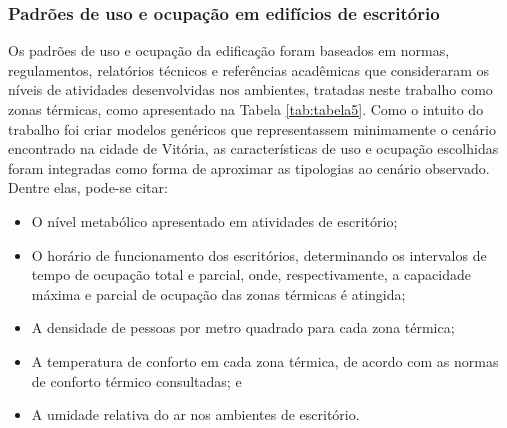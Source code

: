 \subsubsection{Padrões de uso e ocupação em edifícios de escritório}
Os padrões de uso e ocupação da edificação foram baseados em normas, regulamentos, relatórios 
técnicos e referências acadêmicas que consideraram os níveis de atividades desenvolvidas nos 
ambientes, tratadas neste trabalho como zonas térmicas, como apresentado na Tabela \ref{tab:tabela5}.\vspace*{0.3cm} \newline
Como o intuito do trabalho foi criar modelos genéricos que representassem minimamente o 
cenário encontrado na cidade de Vitória, as características de uso e ocupação escolhidas 
foram integradas como forma de aproximar as tipologias ao cenário observado. Dentre elas, 
pode-se citar:
\begin{itemize}
    \item O nível metabólico apresentado em atividades de escritório;
    \item O horário de funcionamento dos escritórios, determinando os intervalos de tempo de ocupação total e parcial, onde, respectivamente, a capacidade máxima e parcial de ocupação das zonas térmicas é atingida;
    \item A densidade de pessoas por metro quadrado para cada zona térmica;
    \item A temperatura de conforto em cada zona térmica, de acordo com as normas de conforto térmico consultadas; e
    \item A umidade relativa do ar nos ambientes de escritório.
\end{itemize}

